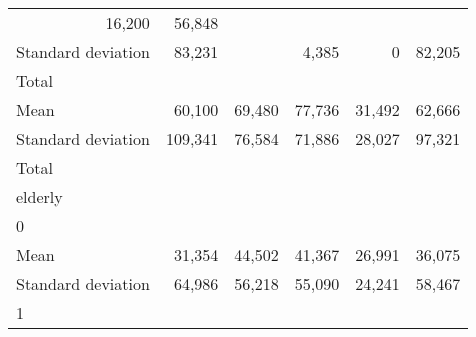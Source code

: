 \begin{tabular}{llllll}
  \multicolumn{1}{r}{16,200} &
  \multicolumn{1}{r}{56,848} \\
\multicolumn{1}{l}{\hspace{4em}Standard deviation} &
  \multicolumn{1}{|r}{83,231} &
  \multicolumn{1}{r}{} &
  \multicolumn{1}{r}{4,385} &
  \multicolumn{1}{r}{0} &
  \multicolumn{1}{r}{82,205} \\
\multicolumn{1}{l}{\hspace{3em}Total} &
  \multicolumn{1}{|r}{} &
  \multicolumn{1}{r}{} &
  \multicolumn{1}{r}{} &
  \multicolumn{1}{r}{} &
  \multicolumn{1}{r}{} \\
\multicolumn{1}{l}{\hspace{4em}Mean} &
  \multicolumn{1}{|r}{60,100} &
  \multicolumn{1}{r}{69,480} &
  \multicolumn{1}{r}{77,736} &
  \multicolumn{1}{r}{31,492} &
  \multicolumn{1}{r}{62,666} \\
\multicolumn{1}{l}{\hspace{4em}Standard deviation} &
  \multicolumn{1}{|r}{109,341} &
  \multicolumn{1}{r}{76,584} &
  \multicolumn{1}{r}{71,886} &
  \multicolumn{1}{r}{28,027} &
  \multicolumn{1}{r}{97,321} \\
\multicolumn{1}{l}{\hspace{1em}Total} &
  \multicolumn{1}{|r}{} &
  \multicolumn{1}{r}{} &
  \multicolumn{1}{r}{} &
  \multicolumn{1}{r}{} &
  \multicolumn{1}{r}{} \\
\multicolumn{1}{l}{\hspace{2em}elderly} &
  \multicolumn{1}{|r}{} &
  \multicolumn{1}{r}{} &
  \multicolumn{1}{r}{} &
  \multicolumn{1}{r}{} &
  \multicolumn{1}{r}{} \\
\multicolumn{1}{l}{\hspace{3em}0} &
  \multicolumn{1}{|r}{} &
  \multicolumn{1}{r}{} &
  \multicolumn{1}{r}{} &
  \multicolumn{1}{r}{} &
  \multicolumn{1}{r}{} \\
\multicolumn{1}{l}{\hspace{4em}Mean} &
  \multicolumn{1}{|r}{31,354} &
  \multicolumn{1}{r}{44,502} &
  \multicolumn{1}{r}{41,367} &
  \multicolumn{1}{r}{26,991} &
  \multicolumn{1}{r}{36,075} \\
\multicolumn{1}{l}{\hspace{4em}Standard deviation} &
  \multicolumn{1}{|r}{64,986} &
  \multicolumn{1}{r}{56,218} &
  \multicolumn{1}{r}{55,090} &
  \multicolumn{1}{r}{24,241} &
  \multicolumn{1}{r}{58,467} \\
\multicolumn{1}{l}{\hspace{3em}1} &
  \multicolumn{1}{|r}{} &

\end{tabular}
